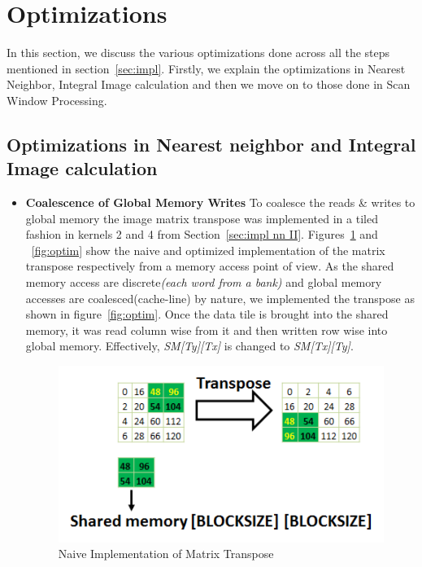 \section{Optimizations}\label{sec:optim}

In this section, we discuss the various optimizations done across all the steps mentioned in section~\ref{sec:impl}. Firstly, we explain the optimizations in Nearest Neighbor, Integral Image calculation and then we move on to those done in Scan Window Processing.

\subsection{Optimizations in Nearest neighbor and Integral Image calculation}\label{sec:nn_optim}

\begin{itemize}

\item \textbf{Coalescence of Global Memory Writes}
To coalesce the reads \& writes to global memory the image matrix transpose was 
implemented in a tiled fashion in kernels 2 and 4 from Section~\ref{sec:impl nn II}. 
Figures~\ref{fig:naive} and ~\ref{fig:optim} show the naive 
and optimized implementation of the matrix transpose respectively from a memory 
access point of view. As the shared memory access are discrete\textit{(each word from a bank)}
and global memory accesses are coalesced(cache-line) by nature, we implemented the 
transpose as shown in figure~\ref{fig:optim}. Once the data tile is brought into the shared memory, 
it was read column wise from it and then written row wise into global memory. 
Effectively, \textit{SM[Ty][Tx]} is changed to \textit{SM[Tx][Ty]}. 

\begin{figure}[h]
  \centering
  \includegraphics[width=\linewidth]{figs/nn_naive_crop.pdf}
  \vspace{0.1in}
  \caption{Naive Implementation of Matrix Transpose }
  \label{fig:naive}
\end{figure}


\end{itemize}
